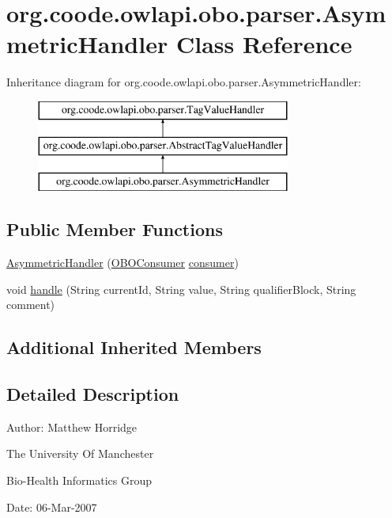 \hypertarget{classorg_1_1coode_1_1owlapi_1_1obo_1_1parser_1_1_asymmetric_handler}{\section{org.\-coode.\-owlapi.\-obo.\-parser.\-Asymmetric\-Handler Class Reference}
\label{classorg_1_1coode_1_1owlapi_1_1obo_1_1parser_1_1_asymmetric_handler}
}
Inheritance diagram for org.\-coode.\-owlapi.\-obo.\-parser.\-Asymmetric\-Handler\-:\begin{figure}[H]
\begin{center}
\leavevmode
\includegraphics[height=3.000000cm]{classorg_1_1coode_1_1owlapi_1_1obo_1_1parser_1_1_asymmetric_handler}
\end{center}
\end{figure}
\subsection*{Public Member Functions}
\begin{DoxyCompactItemize}
\item 
\hyperlink{classorg_1_1coode_1_1owlapi_1_1obo_1_1parser_1_1_asymmetric_handler_a39436062d58b83b157fc3ce9b4d9e822}{Asymmetric\-Handler} (\hyperlink{classorg_1_1coode_1_1owlapi_1_1obo_1_1parser_1_1_o_b_o_consumer}{O\-B\-O\-Consumer} \hyperlink{classorg_1_1coode_1_1owlapi_1_1obo_1_1parser_1_1_abstract_tag_value_handler_ab27f1ff22d15640c5f81585f18265137}{consumer})
\item 
void \hyperlink{classorg_1_1coode_1_1owlapi_1_1obo_1_1parser_1_1_asymmetric_handler_a4ebf954900049e045631f12b6a6fa433}{handle} (String current\-Id, String value, String qualifier\-Block, String comment)
\end{DoxyCompactItemize}
\subsection*{Additional Inherited Members}


\subsection{Detailed Description}
Author\-: Matthew Horridge\par
 The University Of Manchester\par
 Bio-\/\-Health Informatics Group\par
 Date\-: 06-\/\-Mar-\/2007\par
\par
 

